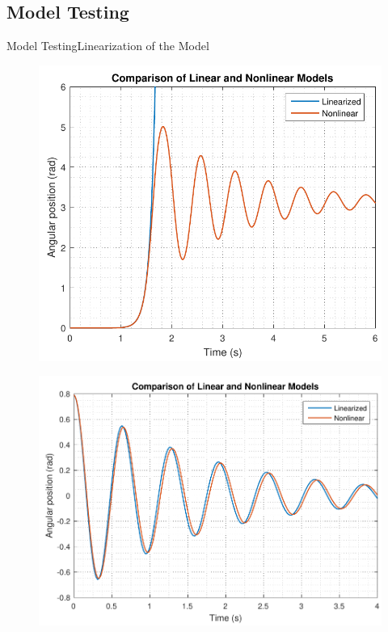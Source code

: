 \subsection{Model Testing}
\begin{frame}{Model Testing}{Linearization of the Model}
  \begin{minipage}{\linewidth}\centering
    \begin{minipage}{0.45\linewidth}
      \begin{figure}[H]
        \centering
        \includegraphics[scale=0.33]{Pictures/LinearizedVSNonlinear}
      \end{figure}
    \end{minipage}
    \begin{minipage}{0.45\linewidth}
      \begin{figure}[H]
        \centering
        \includegraphics[scale=0.33]{Pictures/LinearizedVSNonlinear_0}
      \end{figure}
    \end{minipage}
  \end{minipage}
\end{frame}

